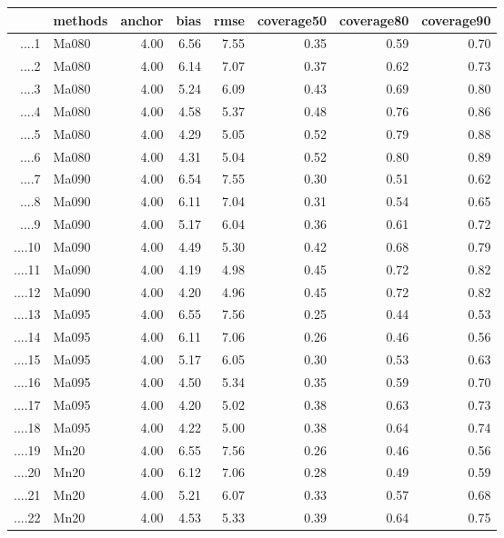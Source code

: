 \begin{table}[ht]
\centering
\begin{tabular}{rlrrrrrr}
  \hline
 & methods & anchor & bias & rmse & coverage50 & coverage80 & coverage90 \\ 
  \hline
....1 & Ma080 & 4.00 & 6.56 & 7.55 & 0.35 & 0.59 & 0.70 \\ 
  ....2 & Ma080 & 4.00 & 6.14 & 7.07 & 0.37 & 0.62 & 0.73 \\ 
  ....3 & Ma080 & 4.00 & 5.24 & 6.09 & 0.43 & 0.69 & 0.80 \\ 
  ....4 & Ma080 & 4.00 & 4.58 & 5.37 & 0.48 & 0.76 & 0.86 \\ 
  ....5 & Ma080 & 4.00 & 4.29 & 5.05 & 0.52 & 0.79 & 0.88 \\ 
  ....6 & Ma080 & 4.00 & 4.31 & 5.04 & 0.52 & 0.80 & 0.89 \\ 
  ....7 & Ma090 & 4.00 & 6.54 & 7.55 & 0.30 & 0.51 & 0.62 \\ 
  ....8 & Ma090 & 4.00 & 6.11 & 7.04 & 0.31 & 0.54 & 0.65 \\ 
  ....9 & Ma090 & 4.00 & 5.17 & 6.04 & 0.36 & 0.61 & 0.72 \\ 
  ....10 & Ma090 & 4.00 & 4.49 & 5.30 & 0.42 & 0.68 & 0.79 \\ 
  ....11 & Ma090 & 4.00 & 4.19 & 4.98 & 0.45 & 0.72 & 0.82 \\ 
  ....12 & Ma090 & 4.00 & 4.20 & 4.96 & 0.45 & 0.72 & 0.82 \\ 
  ....13 & Ma095 & 4.00 & 6.55 & 7.56 & 0.25 & 0.44 & 0.53 \\ 
  ....14 & Ma095 & 4.00 & 6.11 & 7.06 & 0.26 & 0.46 & 0.56 \\ 
  ....15 & Ma095 & 4.00 & 5.17 & 6.05 & 0.30 & 0.53 & 0.63 \\ 
  ....16 & Ma095 & 4.00 & 4.50 & 5.34 & 0.35 & 0.59 & 0.70 \\ 
  ....17 & Ma095 & 4.00 & 4.20 & 5.02 & 0.38 & 0.63 & 0.73 \\ 
  ....18 & Ma095 & 4.00 & 4.22 & 5.00 & 0.38 & 0.64 & 0.74 \\ 
  ....19 & Mn20 & 4.00 & 6.55 & 7.56 & 0.26 & 0.46 & 0.56 \\ 
  ....20 & Mn20 & 4.00 & 6.12 & 7.06 & 0.28 & 0.49 & 0.59 \\ 
  ....21 & Mn20 & 4.00 & 5.21 & 6.07 & 0.33 & 0.57 & 0.68 \\ 
  ....22 & Mn20 & 4.00 & 4.53 & 5.33 & 0.39 & 0.64 & 0.75 \\ 

\end{tabular}
\end{table}
